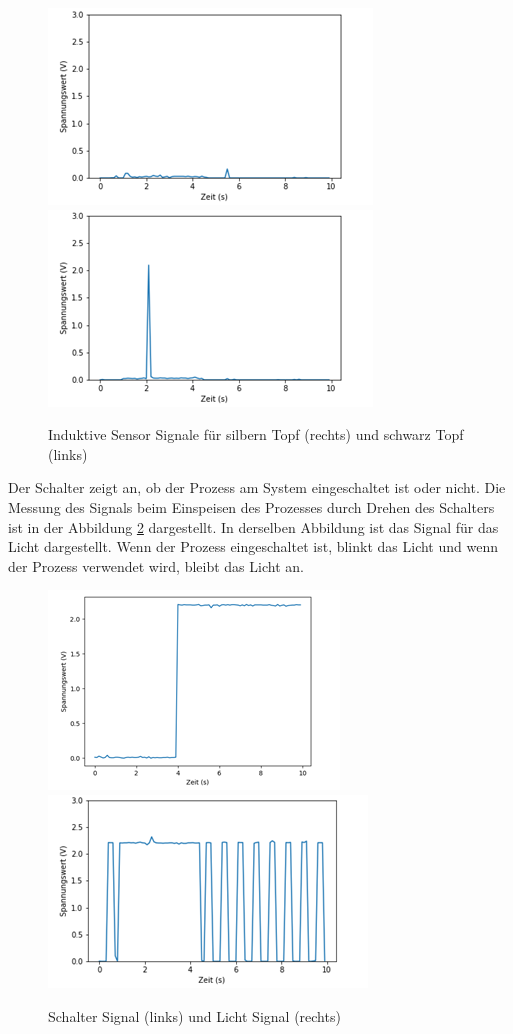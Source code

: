 \documentclass[12pt,a4paper]{scrartcl}
\numberwithin{equation}{section}
\begin{document}
\begin{figure}[ht!]
	\centering
	  \includegraphics[scale=0.75]{induktiv_sensor_black.png}
	  \includegraphics[scale=0.75]{induktiv_sensor.png}
	  \caption{Induktive Sensor Signale für silbern Topf (rechts) und schwarz Topf (links)}
	  \label{induktiv_sensor}
\end{figure}

Der Schalter zeigt an, ob der Prozess am System eingeschaltet ist oder nicht. Die Messung des Signals beim Einspeisen des Prozesses durch Drehen des Schalters ist in der Abbildung \ref{schalter} dargestellt. In derselben Abbildung ist das Signal für das Licht dargestellt. Wenn der Prozess eingeschaltet ist, blinkt das Licht und wenn der Prozess verwendet wird, bleibt das Licht an. 

\begin{figure}[ht!]
	\centering
	  \includegraphics[scale=0.75]{schalter.png}
	  \includegraphics[scale=0.75]{licht.png}
	  \caption{Schalter Signal (links) und Licht Signal (rechts)}
	  \label{schalter}
\end{figure}
\end{document}
